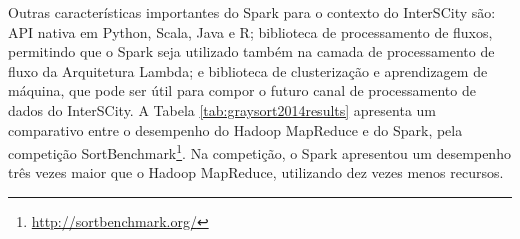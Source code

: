 \begin{table}[!htbp]
    \centering
    \caption[Resultados da Sort Benchmark 2014, categoria GraySort]{Resultados da Sort Benchmark 2014, categoria GraySort. Fonte: Databricks, 2014\footnotemark.}
    \label{tab:graysort2014results}
\end{table}

Outras características importantes do Spark para o contexto do
InterSCity são: API nativa em Python, Scala, Java e R; biblioteca de
processamento de fluxos, permitindo que o Spark seja utilizado também na camada
de processamento de fluxo da Arquitetura Lambda; e biblioteca de clusterização e
aprendizagem de máquina, que pode ser útil para compor o futuro canal de
processamento de dados do InterSCity. A Tabela \ref{tab:graysort2014results}
apresenta um comparativo entre o desempenho do Hadoop MapReduce e do Spark, pela
competição SortBenchmark\footnote{\url{http://sortbenchmark.org/}}. Na
competição, o Spark apresentou um desempenho três vezes maior que o Hadoop
MapReduce, utilizando dez vezes menos recursos.

